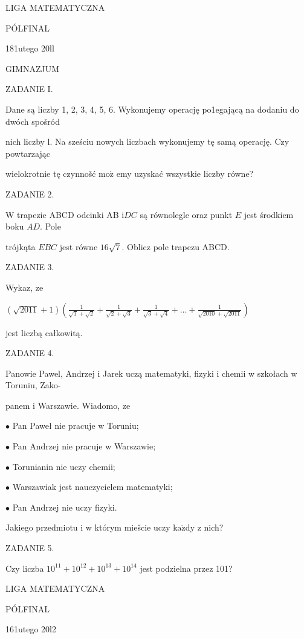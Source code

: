 \documentclass[a4paper,12pt]{article}
\begin{document}
LIGA MATEMATYCZNA

PÓLFINAL

181utego 20ll

GIMNAZJUM

ZADANIE I.

Dane są liczby 1, 2, 3, 4, 5, 6. Wykonujemy operację po1egającą na dodaniu do dwóch spošród

nich liczby l. Na sześciu nowych liczbach wykonujemy tę samą operację. Czy powtarzając

wielokrotnie tę czynnošć $\mathrm{m}\mathrm{o}\dot{\mathrm{z}}$ emy uzyskać wszystkie liczby równe?

ZADANIE 2.

$\mathrm{W}$ trapezie ABCD odcinki AB $\mathrm{i}DC$ są równolegle oraz punkt $E$ jest środkiem boku $AD$. Pole

trójkąta $EBC$ jest równe $16\sqrt{7}$. Oblicz pole trapezu ABCD.

ZADANIE 3.

Wykaz, $\dot{\mathrm{z}}\mathrm{e}$

$(\displaystyle \sqrt{2011}+1)(\frac{1}{\sqrt{1}+\sqrt{2}}+\frac{1}{\sqrt{2}+\sqrt{3}}+\frac{1}{\sqrt{3}+\sqrt{4}}+\ldots+\frac{1}{\sqrt{2010}+\sqrt{2011}})$

jest liczbą całkowitą.

ZADANIE 4.

Panowie Pawel, Andrzej i Jarek uczą matematyki, fizyki i chemii w szkołach w Toruniu, Zako-

panem i Warszawie. Wiadomo, $\dot{\mathrm{z}}\mathrm{e}$

$\bullet$ Pan Paweł nie pracuje w Toruniu;

$\bullet$ Pan Andrzej nie pracuje w Warszawie;

$\bullet$ Torunianin nie uczy chemii;

$\bullet$ Warszawiak jest nauczycielem matematyki;

$\bullet$ Pan Andrzej nie uczy fizyki.

Jakiego przedmiotu i w którym miešcie uczy $\mathrm{k}\mathrm{a}\dot{\mathrm{z}}\mathrm{d}\mathrm{y}$ z nich?

ZADANIE 5.

Czy liczba $10^{11}+10^{12}+10^{13}+10^{14}$ jest podzielna przez 101?






LIGA MATEMATYCZNA

PÓLFINAL

161utego 20l2
\end{document}
